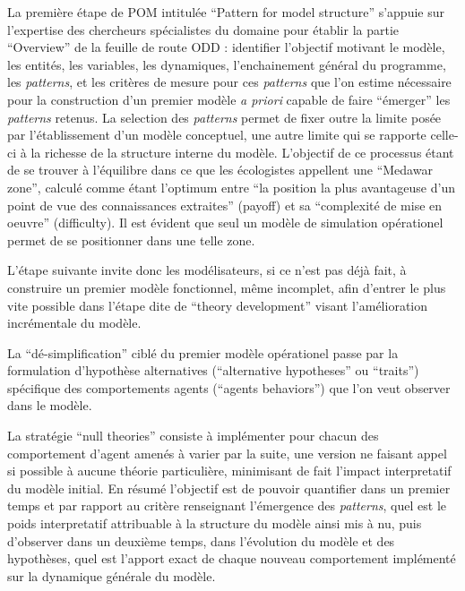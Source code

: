 La première étape de POM intitulée \foreignquote{english}{Pattern for model structure} s'appuie sur l'expertise des chercheurs spécialistes du domaine pour établir la partie \foreignquote{english}{Overview} de la feuille de route ODD : identifier l'objectif motivant le modèle, les entités, les variables, les dynamiques, l'enchainement général du programme, les \textit{patterns}, et les critères de mesure pour ces \textit{patterns} que l'on estime nécessaire pour la construction d'un premier modèle \textit{a priori} capable de faire \enquote{émerger} les \textit{patterns} retenus. La selection des \textit{patterns} permet de fixer outre la limite posée par l'établissement d'un modèle conceptuel, une autre limite qui se rapporte celle-ci à la richesse de la structure interne du modèle. L'objectif de ce processus étant de se trouver à l'équilibre dans ce que les écologistes appellent une \enquote{Medawar zone}, calculé comme étant l'optimum entre \enquote{la position la plus avantageuse d'un point de vue des connaissances extraites} (payoff) et sa \enquote{complexité de mise en oeuvre} (difficulty). Il est évident que seul un modèle de simulation opérationel permet de se positionner dans une telle zone. 

L'étape suivante invite donc les modélisateurs, si ce n'est pas déjà fait, à construire un premier modèle fonctionnel, même incomplet, afin d'entrer le plus vite possible dans l'étape dite de \foreignquote{english}{theory development} visant l'amélioration incrémentale du modèle.

La \enquote{dé-simplification} ciblé du premier modèle opérationel passe par la formulation d'hypothèse alternatives (\foreignquote{english}{alternative hypotheses} ou \foreignquote{english}{traits}) spécifique des comportements agents (\foreignquote{english}{agents behaviors}) que l'on veut observer dans le modèle.  

La stratégie \enquote{null theories}   consiste à implémenter pour chacun des comportement d'agent amenés à varier par la suite, une version ne faisant appel si possible à aucune théorie particulière, minimisant de fait l'impact interpretatif du modèle initial. En résumé l'objectif est de pouvoir quantifier dans un premier temps et par rapport au critère renseignant l'émergence des \textit{patterns}, quel est le poids interpretatif attribuable à la structure du modèle ainsi mis à nu, puis d'observer dans un deuxième temps, dans l'évolution du modèle et des hypothèses, quel est l'apport exact de chaque nouveau comportement implémenté sur la dynamique générale du modèle.


